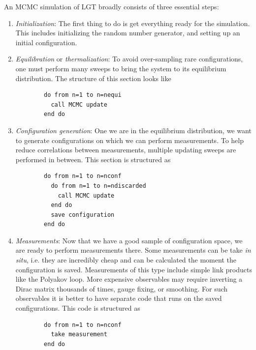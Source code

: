 An MCMC simulation of LGT broadly consists of three essential steps:
\begin{enumerate}
  \item {\it Initialization}: The first thing to do is get everything ready for
        the simulation. This includes initializing the random number generator,
        and setting up an initial configuration.
  \item {\it Equilibration} or {\it thermalization}:
        To avoid over-sampling rare configurations,
        one must perform many sweeps to bring the system to its equilibrium 
        distribution. The structure of this section looks like 
        \begin{verbatim}
        do from n=1 to n=nequi 
          call MCMC update
        end do
        \end{verbatim}
  \item {\it Configuration generation}: One we are in the equilibrium
        distribution, we want to generate configurations on which we can
        perform measurements. To help reduce correlations between
        measurements, multiple updating sweeps are performed in between.
        This section is structured as
        \begin{verbatim}
        do from n=1 to n=nconf
          do from n=1 to n=ndiscarded
            call MCMC update
          end do
          save configuration 
        end do
        \end{verbatim}
  \item {\it Measurements}: Now that we have a good sample of configuration
        space, we are ready to perform measurements there. Some measurements
        can be take {\it in situ}, i.e. they are incredibly cheap and can be
        calculated the moment the configuration is saved. Measurements of this
        type include simple link products like the Polyakov loop. More expensive
        observables may require inverting a Dirac matrix thousands of times, 
        gauge fixing, or smoothing. For such observables it is better to
        have separate code that runs on the saved configurations. This
        code is structured as
        \begin{verbatim}
        do from n=1 to n=nconf
          take measurement 
        end do
        \end{verbatim}
\end{enumerate}





